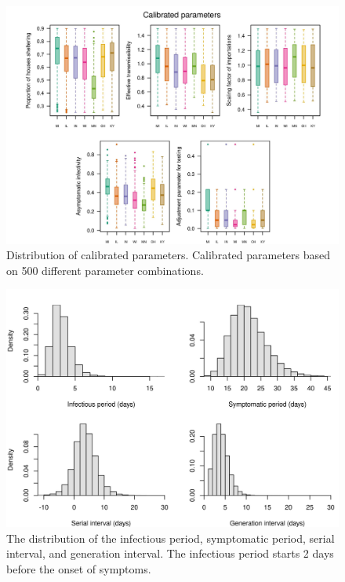 \documentclass[11pt]{article}
\begin{document}
\begin{figure}[hb!]
\centering
\includegraphics[width=\textwidth]{../figures/report_figure_calibrated_parameters.jpeg} 
\caption{\label{fig_calibrated_parameters}Distribution of calibrated parameters. Calibrated parameters based on 500 different parameter combinations.}
\end{figure}

\begin{figure}[hb!]
\centering
\includegraphics[width=\textwidth]{../figures/report_figure_parameter_periods.jpeg} 
\caption{\label{fig_params_periods}The distribution of the infectious period, symptomatic period, serial interval, and generation interval. The infectious period starts 2 days before the onset of symptoms.}
\end{figure}
\end{document}
